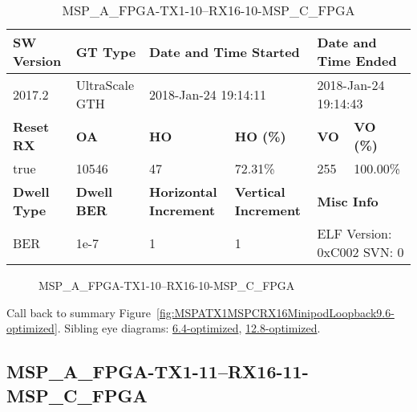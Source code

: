 \begin{table}[h]
\centering
\caption{MSP\_A\_FPGA-TX1-10--RX16-10-MSP\_C\_FPGA}
\label{tab:MSPAFPGATX110RX1610MSPCFPGA9.6-optimized}
\begin{tabular}{@{}|l|l|l|l|l|l|@{}}
\toprule
\textbf{SW Version}                & \textbf{GT Type}   & \multicolumn{2}{l|}{\textbf{Date and Time Started}}            & \multicolumn{2}{l|}{\textbf{Date and Time Ended}}        \\ \midrule
2017.2                       & UltraScale GTH          & \multicolumn{2}{l|}{2018-Jan-24 19:14:11}                   & \multicolumn{2}{l|}{2018-Jan-24 19:14:43}               \\ \midrule
\textbf{Reset RX}                  & \textbf{OA} & \textbf{HO}   & \textbf{HO (\%)} & \textbf{VO} & \textbf{VO (\%)} \\ \midrule
true & 10546        & 47          & 72.31\%        & 255        & 100.00\%       \\ \midrule
\textbf{Dwell Type}                & \textbf{Dwell BER} & \textbf{Horizontal Increment} & \textbf{Vertical Increment}    & \multicolumn{2}{l|}{\textbf{Misc Info}}                  \\ \midrule
BER                            & 1e-7        & 1        & 1           & \multicolumn{2}{l|}{ELF Version: 0xC002 SVN: 0}                         \\ \bottomrule
\end{tabular}
\end{table}

\begin{figure}[h]
\caption{MSP\_A\_FPGA-TX1-10--RX16-10-MSP\_C\_FPGA} \label{fig:MSPAFPGATX110RX1610MSPCFPGA9.6-optimized}
\end{figure}

Call back to summary Figure~\ref{fig:MSPATX1MSPCRX16MinipodLoopback9.6-optimized}.
Sibling eye diagrams: \hyperref[sec:MSPAFPGATX110RX1610MSPCFPGA6.4-optimized]{6.4-optimized}, \hyperref[sec:MSPAFPGATX110RX1610MSPCFPGA12.8-optimized]{12.8-optimized}.

\clearpage
\newpage


\subsection{MSP\_A\_FPGA-TX1-11--RX16-11-MSP\_C\_FPGA}\label{sec:MSPAFPGATX111RX1611MSPCFPGA9.6-optimized}


